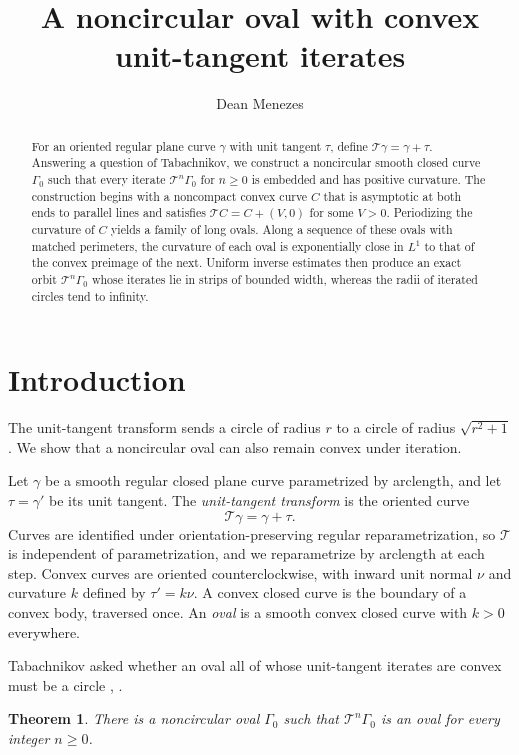 \documentclass[11pt]{article}
\title{A noncircular oval with convex unit-tangent iterates}
\author{Dean Menezes}
\date{}
\numberwithin{equation}{section}
\newtheorem{theorem}{Theorem}[section]
\newcommand{\Tmap}{\mathcal T}
\begin{document}
\maketitle

\begin{abstract}
For an oriented regular plane curve \(\gamma\) with unit tangent \(\tau\),
define \(\Tmap\gamma=\gamma+\tau\). Answering a question of Tabachnikov, we
construct a noncircular smooth closed curve \(\Gamma_0\) such that every
iterate \(\Tmap^n\Gamma_0\) for \(n\geq0\) is embedded and has positive
curvature. The construction begins with a noncompact convex curve \(C\) that is
asymptotic at both ends to parallel lines and satisfies \(\Tmap C=C+(V,0)\) for
some \(V>0\). Periodizing the curvature of \(C\) yields a family of long ovals.
Along a sequence of these ovals with matched perimeters, the curvature of each
oval is exponentially close in \(L^1\) to that of the convex preimage of the
next. Uniform inverse estimates then produce an exact orbit \(\Tmap^n\Gamma_0\)
whose iterates lie in strips of bounded width, whereas the radii of iterated
circles tend to infinity.
\end{abstract}

\section{Introduction}

The unit-tangent transform sends a circle of radius \(r\) to a circle of
radius \(\sqrt{r^2+1}\). We show that a noncircular oval can also remain
convex under iteration.

Let \(\gamma\) be a smooth regular closed plane curve
parametrized by arclength, and let \(\tau=\gamma'\) be its unit tangent.
The \emph{unit-tangent transform} is the oriented curve
\[
  \Tmap\gamma=\gamma+\tau.
\]
Curves are identified under orientation-preserving regular
reparametrization, so \(\Tmap\) is independent of parametrization, and we
reparametrize by arclength at each step. Convex curves are
oriented counterclockwise, with inward unit normal \(\nu\) and curvature
\(k\) defined by \(\tau'=k\nu\). A convex closed curve is the boundary of a
convex body, traversed once. An \emph{oval} is a smooth convex closed curve
with \(k>0\) everywhere.

Tabachnikov asked whether an oval all of whose unit-tangent iterates are
convex must be a circle \cite[Section~9]{Tabachnikov2015},
\cite[Conjecture~4]{Tabachnikov2023}.

\begin{theorem}\label{thm:main}
There is a noncircular oval \(\Gamma_0\) such that \(\Tmap^n\Gamma_0\) is an
oval for every integer \(n\geq0\).
\end{theorem}
\end{document}
